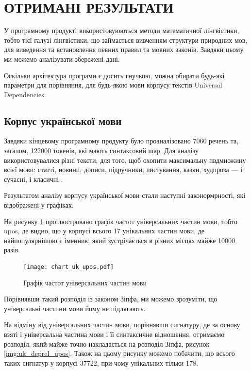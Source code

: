 \section{ОТРИМАНІ РЕЗУЛЬТАТИ}

У програмному продукті використовуюються методи математичної лінгвістики,
тобто тієї галузі лінгвістики,
що займається вивченням структури природних мов, для виведення та встановлення
певних правил та мовних законів. Завдяки цьому ми можемо аналізувати збережені дані.

Оскільки архітектура програми є досить гнучкою, можна обирати будь-які
параметри для порівняння, для будь-якою мови корпусу текстів Universal
Dependencies.

\subsection{Корпус української мови}
Завдяки кінцевому програмному продукту було проаналізовано 7060 речень 
та, загалом, 122000 токенів, які мають синтаксовий шар.
Для аналізу використовувалися різні тексти, для того, щоб охопити максимальну
пвдмножину всієї мови: статті, новини, дописи, підручники, листування, казки, худпроза — і сучасні, і класичні \cite{bib12}.

Результатом аналізу корпусу української мови стали наступні законормрності,
які відображені у графіках.

На рисунку \ref{img:uk_upos} проілюстровано графік частот універсальних
частин мови, тобто upos, де видно, що у корпусі всього 17 унікальних
частин мови, де найпопулярнішою є іменник, який зустрічається в різних
місцях майже 10000 разів.

\begin{figure}[ht]
  \begin{center}
    \texttt{[image: chart\_uk\_upos.pdf]}
  \end{center}
  \caption{Графік частот універсальних частин мови}
  \label{img:uk_upos}
\end{figure}

\newpage
Порівнявши такий розподіл із законом Зіпфа, ми можемо зрозуміти, що
універсальні частини мови йому не підлягають.

На відміну від універсальних частин мови, порівнявши сигнатуру, де за основу
взяті і універсальна частина мови і її синтаксичне відношення, отримаємо
розподіл, який майже точно накладається на розподіл Зіпфа, рисунок
\ref{img:uk_deprel_upos}. Також на цьому рисунку можемо побачити, що 
всього таких сигнатур у корпусі 37722, при чому унікальних
тільки 178.

